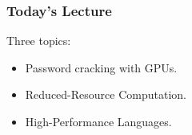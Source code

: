 \documentclass[aspectratio=43]{beamer}
\newenvironment{changemargin}[1]{%
  \begin{list}{}{%
    \setlength{\topsep}{0pt}%
    \setlength{\leftmargin}{#1}%
    \setlength{\rightmargin}{1em}
    \setlength{\listparindent}{\parindent}%
    \setlength{\itemindent}{\parindent}%
    \setlength{\parsep}{\parskip}%
  }%
  \item[]}{\end{list}}
\begin{document}
\begin{frame}
  \frametitle{Today's Lecture}

\begin{changemargin}{2cm}

  Three topics:
  \begin{itemize}
    \item Password cracking with GPUs.
    \item Reduced-Resource Computation.
    \item High-Performance Languages.
  \end{itemize}~\\[1em]

\end{changemargin}
\end{frame}
\end{document}
